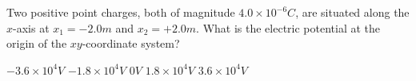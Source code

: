 
\begin{questions}
\setcounter{question}{0}

\question
Two positive point charges, both of magnitude $4.0 \times 10^{-6} \unit{C}$, are situated along the $x$-axis at $x_{1}=-2.0 \unit{m}$ and $x_{2}=+2.0 \unit{m}$. What is the electric potential at the origin of the $xy$-coordinate system?

\begin{oneparchoices}
    \choice $-3.6 \times 10^{4} \unit{V}$
    \choice $-1.8 \times 10^{4} \unit{V}$
    \choice $0                  \unit{V}$
    \choice $1.8 \times 10^{4}  \unit{V}$
    \choice $3.6 \times 10^{4}  \unit{V}$
\end{oneparchoices}

\end{questions}
